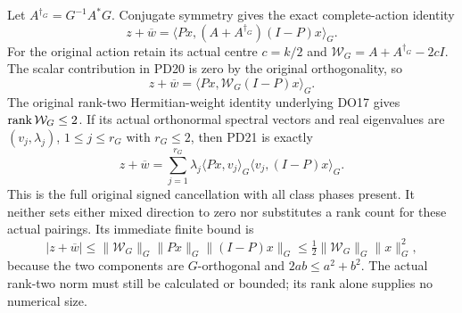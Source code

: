 Let $A^{\dagger_G}=G^{-1}A^*G$.  Conjugate symmetry gives the exact
complete-action identity
\[
 \boxed{z+\overline w
       =\langle Px,(A+A^{\dagger_G})(I-P)x\rangle_G.}            \tag{PD20}
\]
For the original action retain its actual centre $c=k/2$ and
$\mathcal W_G=A+A^{\dagger_G}-2cI$.  The scalar contribution in
PD20 is zero by the original orthogonality, so
\[
 z+\overline w=\langle Px,\mathcal W_G(I-P)x\rangle_G.           \tag{PD21}
\]
The original rank-two Hermitian-weight identity underlying DO17 \cite{mproj:DO}
gives $\operatorname{rank}\mathcal W_G\le2$.  If its actual orthonormal spectral
vectors and real eigenvalues are $(v_j,\lambda_j)$, $1\le j\le r_G$
with $r_G\le2$, then PD21 is exactly
\[
 z+\overline w
   =\sum_{j=1}^{r_G}\lambda_j
       \langle Px,v_j\rangle_G\langle v_j,(I-P)x\rangle_G.        \tag{PD22}
\]
This is the full original signed cancellation with all class phases
present.  It neither sets either mixed direction to zero nor
substitutes a rank count for these actual pairings.  Its immediate
finite bound is
\[
 |z+\overline w|
 \le\|\mathcal W_G\|_G\|Px\|_G\|(I-P)x\|_G
 \le\tfrac12\|\mathcal W_G\|_G\|x\|_G^2,                      \tag{PD23}
\]
because the two components are $G$-orthogonal and
$2ab\le a^2+b^2$.  The actual rank-two norm must still be
calculated or bounded; its rank alone supplies no numerical size.

